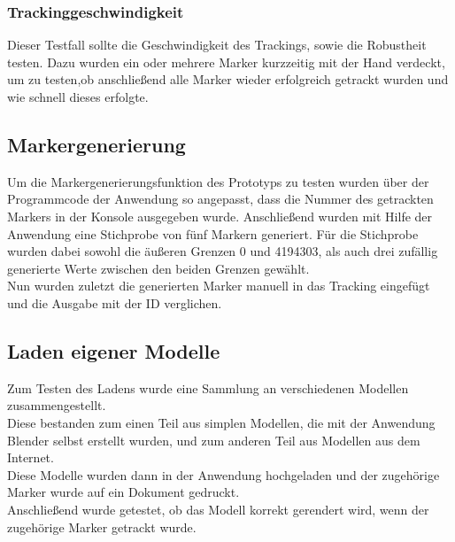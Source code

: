 \subsubsection{Trackinggeschwindigkeit} Dieser Testfall sollte die Geschwindigkeit des Trackings, sowie die Robustheit testen. Dazu wurden ein oder mehrere Marker kurzzeitig mit der Hand verdeckt, um zu testen,ob anschließend alle Marker wieder erfolgreich getrackt wurden und wie schnell dieses erfolgte.



\subsection{Markergenerierung}
Um die Markergenerierungsfunktion des Prototyps zu testen wurden über der Programmcode der Anwendung so angepasst, dass die Nummer des getrackten Markers in der Konsole ausgegeben wurde. Anschließend wurden mit Hilfe der Anwendung eine Stichprobe von fünf Markern generiert. Für die Stichprobe wurden dabei sowohl die äußeren Grenzen 0 und 4194303, als auch drei zufällig generierte Werte zwischen den beiden Grenzen gewählt.\\
Nun wurden zuletzt die generierten Marker manuell in das Tracking eingefügt und die Ausgabe mit der ID verglichen.

\subsection{Laden eigener Modelle}
Zum Testen des Ladens wurde eine Sammlung an verschiedenen Modellen zusammengestellt.\\
Diese bestanden zum einen Teil aus simplen Modellen, die mit der Anwendung Blender selbst erstellt wurden, und zum anderen Teil aus Modellen aus dem Internet.\\
Diese Modelle wurden dann in der Anwendung hochgeladen und der zugehörige Marker wurde auf ein Dokument gedruckt. \\
Anschließend wurde getestet, ob das Modell korrekt gerendert wird, wenn der zugehörige Marker getrackt wurde.






